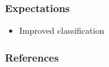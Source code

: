 \documentclass{beamer}
\begin{document}
    \begin{frame}[allowframebreaks]
        \frametitle{Expectations}

        \begin{itemize}
            \item Improved classification
        \end{itemize}
    \end{frame}

   	\begin{frame}[allowframebreaks]
        \frametitle{References}
        
        
    \end{frame}
\end{document}

